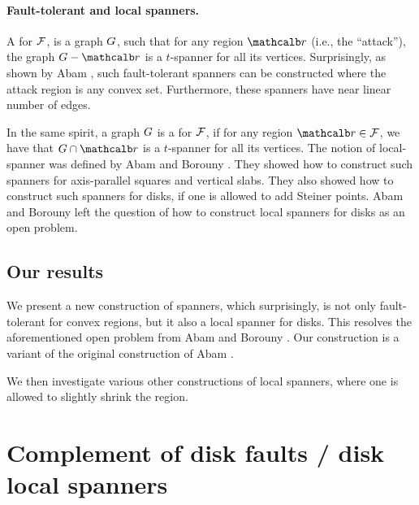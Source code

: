 \documentclass[12pt]{article}%
\begin{document}
\paragraph{Fault-tolerant and local spanners.}

A  for $\mathcal{F}$, is a graph $G$, such that
for any region $\region$ (i.e., the ``attack''), the graph
$\G \gminus \region$ is a $t$-spanner for all its
vertices. Surprisingly, as shown by Abam \etal \cite{abfg-rftgs-09},
such fault-tolerant spanners can be constructed where the attack
region is any convex set. Furthermore, these spanners have near linear
number of edges.

In the same spirit, a graph $G$ is a  for $\mathcal{F}$,
if for any region $\region \in \FF$, we have that
$\restrictY{\G}{\region}$ is a $t$-spanner for all its vertices.  The
notion of local-spanner was defined by Abam and Borouny
\cite{ab-lgs-21}. They showed how to construct such spanners for
axis-parallel squares and vertical slabs. They also showed how to
construct such spanners for disks, if one is allowed to add Steiner
points. Abam and Borouny left the question of how to construct local
spanners for disks as an open problem.

\subsection*{Our results}

We present a new construction of spanners, which surprisingly, is not
only fault-tolerant for convex regions, but it also a local spanner
for disks. This resolves the aforementioned open problem from Abam and
Borouny \cite{ab-lgs-21}. Our construction is a variant of the
original construction of Abam \etal \cite{abfg-rftgs-09}.

We then investigate various other constructions of local spanners,
where one is allowed to slightly shrink the region.
	


\section{Complement of disk faults / disk local spanners}
	
	
\end{document}
